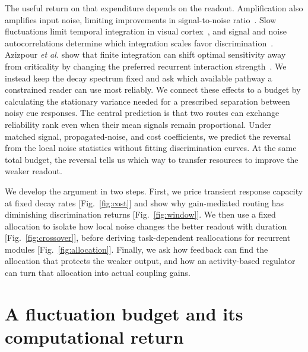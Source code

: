 \documentclass[aps,10pt,onecolumn,superscriptaddress,nofootinbib,longbibliography,
  amsmath,amssymb,floatfix]{revtex4-2}
\begin{document}
The useful return on that expenditure depends on the readout.
Amplification also amplifies input noise, limiting improvements
in signal-to-noise ratio~\cite{bondanelli2020}. Slow fluctuations
limit temporal integration in visual cortex~\cite{goris2018integration},
and signal and noise autocorrelations determine which integration
scales favor discrimination~\cite{ahmed2026temporal}.
Azizpour \emph{et al.} show that finite integration can shift optimal
sensitivity away from criticality by changing the preferred recurrent
interaction strength~\cite{azizpour2026finite}. We instead keep the
decay spectrum fixed and ask which available pathway a constrained
reader can use most reliably.
We connect these effects to a budget by calculating the stationary
variance needed for a prescribed separation between noisy cue
responses. The central prediction is that two routes can exchange
reliability rank even when their mean signals remain proportional.
Under matched signal, propagated-noise, and cost coefficients,
we predict the reversal from the local noise statistics without
fitting discrimination curves. At the same total budget, the
reversal tells us which way to transfer resources to improve the
weaker readout.

We develop the argument in two steps. First, we price transient
response capacity at fixed decay rates [Fig.~\ref{fig:cost}] and
show why gain-mediated routing has diminishing discrimination
returns [Fig.~\ref{fig:window}]. We then use a fixed allocation to
isolate how local noise changes the better readout with duration
[Fig.~\ref{fig:crossover}], before deriving task-dependent
reallocations for recurrent modules [Fig.~\ref{fig:allocation}].
Finally, we ask how feedback can find the allocation that protects
the weaker output, and how an activity-based regulator can turn
that allocation into actual coupling gains.

\section{A fluctuation budget and its computational return}
\label{sec:model}
\end{document}
